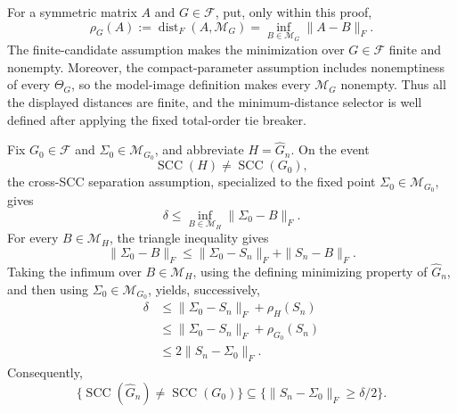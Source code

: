 For a symmetric matrix \(A\) and \(G\in\mathcal F\), put, only within this proof,
\[
\rho_G(A):=\operatorname{dist}_F(A,\mathcal M_G)
=\inf_{B\in\mathcal M_G}\|A-B\|_F.
\]
The finite-candidate assumption makes the minimization over \(G\in\mathcal F\) finite and nonempty.  Moreover, the compact-parameter assumption includes nonemptiness of every \(\Theta_G\), so the model-image definition makes every \(\mathcal M_G\) nonempty.  Thus all the displayed distances are finite, and the minimum-distance selector is well defined after applying the fixed total-order tie breaker.

Fix \(G_0\in\mathcal F\) and \(\Sigma_0\in\mathcal M_{G_0}\), and abbreviate \(H=\widehat G_n\).  On the event
\[
\operatorname{SCC}(H)\ne\operatorname{SCC}(G_0),
\]
the cross-SCC separation assumption, specialized to the fixed point \(\Sigma_0\in\mathcal M_{G_0}\), gives
\[
\delta
\le \inf_{B\in\mathcal M_H}\|\Sigma_0-B\|_F.
\]
For every \(B\in\mathcal M_H\), the triangle inequality gives
\[
\|\Sigma_0-B\|_F
\le \|\Sigma_0-S_n\|_F+\|S_n-B\|_F.
\]
Taking the infimum over \(B\in\mathcal M_H\), using the defining minimizing property of \(\widehat G_n\), and then using \(\Sigma_0\in\mathcal M_{G_0}\), yields, successively,
\[
\begin{aligned}
\delta
&\le \|\Sigma_0-S_n\|_F+\rho_H(S_n)\\
&\le \|\Sigma_0-S_n\|_F+\rho_{G_0}(S_n)\\
&\le 2\|S_n-\Sigma_0\|_F.
\end{aligned}
\]
Consequently,
\[
\bigl\{\operatorname{SCC}(\widehat G_n)\ne\operatorname{SCC}(G_0)\bigr\}
\subseteq
\bigl\{\|S_n-\Sigma_0\|_F\ge\delta/2\bigr\}.
\tag{1}
\]

